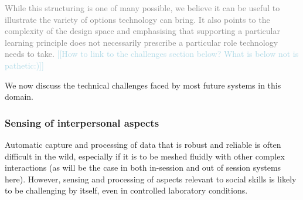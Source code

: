 \documentclass[prodmode,acmtochi]{acmsmall}
\newcommand{\todo}[1]{\textrm{\textrm{\textcolor{LightBlue}{[[#1]]} } } }
\newcommand{\rephrase}[1]{\textrm{\textrm{\textcolor{gray}{#1}}}}
\begin{document}
        
 \rephrase{While this structuring is one of many possible, we believe it can be useful to illustrate the variety of options technology can bring. It also points to the complexity of the design space and emphasising that supporting a particular learning principle does not necessarily prescribe a particular role technology needs to take.} 
\todo{How to link to the challenges section below? What is below not is pathetic:)}

We now discuss the technical challenges faced by most future systems in this domain. 


\fi




\subsubsection{Sensing of interpersonal aspects} Automatic capture and processing of data that is robust and reliable is often difficult in the wild, especially if it is to be meshed fluidly with other complex interactions (as will be the case in both in-session and out of session systems here). However, sensing and processing of aspects relevant to social skills is likely to be challenging by itself, even in controlled laboratory conditions.
\end{document}
